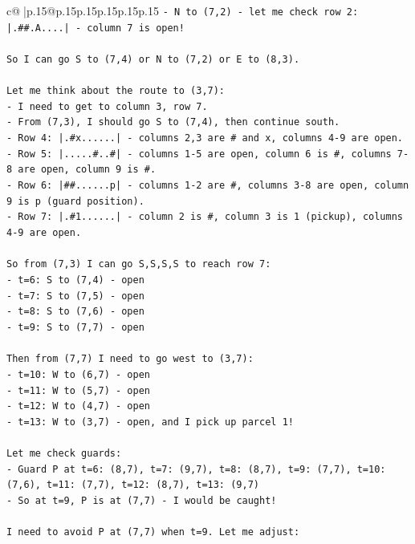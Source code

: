 \documentclass{article}
\begin{document}
{\begin{supertabular}{c@{$\;$}|p{.15\linewidth}@{}p{.15\linewidth}p{.15\linewidth}p{.15\linewidth}p{.15\linewidth}p{.15\linewidth}}
{{{\texttt{{-} N to (7,2) {-} let me check row 2: |.\#\#.A....| {-} column 7 is open!} \\
\\ 
\texttt{So I can go S to (7,4) or N to (7,2) or E to (8,3).} \\
\\ 
\texttt{Let me think about the route to (3,7):} \\
\texttt{{-} I need to get to column 3, row 7.} \\
\texttt{{-} From (7,3), I should go S to (7,4), then continue south.} \\
\texttt{{-} Row 4: |.\#x......| {-} columns 2,3 are \# and x, columns 4{-}9 are open.} \\
\texttt{{-} Row 5: |.....\#..\#| {-} columns 1{-}5 are open, column 6 is \#, columns 7{-}8 are open, column 9 is \#.} \\
\texttt{{-} Row 6: |\#\#......p| {-} columns 1{-}2 are \#, columns 3{-}8 are open, column 9 is p (guard position).} \\
\texttt{{-} Row 7: |.\#1......| {-} column 2 is \#, column 3 is 1 (pickup), columns 4{-}9 are open.} \\
\\ 
\texttt{So from (7,3) I can go S,S,S,S to reach row 7:} \\
\texttt{{-} t=6: S to (7,4) {-} open} \\
\texttt{{-} t=7: S to (7,5) {-} open} \\
\texttt{{-} t=8: S to (7,6) {-} open} \\
\texttt{{-} t=9: S to (7,7) {-} open} \\
\\ 
\texttt{Then from (7,7) I need to go west to (3,7):} \\
\texttt{{-} t=10: W to (6,7) {-} open} \\
\texttt{{-} t=11: W to (5,7) {-} open} \\
\texttt{{-} t=12: W to (4,7) {-} open} \\
\texttt{{-} t=13: W to (3,7) {-} open, and I pick up parcel 1!} \\
\\ 
\texttt{Let me check guards:} \\
\texttt{{-} Guard P at t=6: (8,7), t=7: (9,7), t=8: (8,7), t=9: (7,7), t=10: (7,6), t=11: (7,7), t=12: (8,7), t=13: (9,7)} \\
\texttt{{-} So at t=9, P is at (7,7) {-} I would be caught!} \\
\\ 
\texttt{I need to avoid P at (7,7) when t=9. Let me adjust:} \\
}}}
\end{supertabular}}
\end{document}
